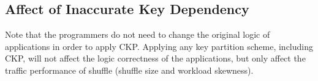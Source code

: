 \documentclass[10pt,journal,compsoc]{IEEEtran}
\begin{document}







\subsection{Affect of Inaccurate Key Dependency}\label{section:inaccurate}
Note that the programmers do not need to change the original logic of applications in order to apply CKP. 
Applying any key partition scheme, including CKP, will not affect
the logic correctness of the applications, but only affect the traffic 
performance of shuffle (shuffle size and workload skewness). 
\end{document}
